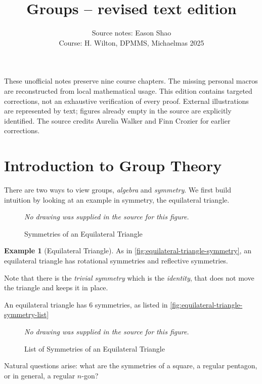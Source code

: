 \documentclass{article}
\title{Groups -- revised text edition}
\author{Source notes: Eason Shao\\Course: H. Wilton, DPMMS, Michaelmas 2025}
\date{}
\theoremstyle{definition}
\newtheorem*{example*}{Example}
\theoremstyle{remark}
\begin{document}
\maketitle
These unofficial notes preserve nine course chapters. The missing personal macros are reconstructed from local mathematical usage. This edition contains targeted corrections, not an exhaustive verification of every proof. External illustrations are represented by text; figures already empty in the source are explicitly identified. The source credits Aurelia Walker and Finn Crozier for earlier corrections.
\tableofcontents
\section{Introduction to Group Theory}
\label{sec:introduction-to-group-theory}

There are two ways to view groups, \emph{algebra} and \emph{symmetry}. We first build intuition by looking at an example in symmetry, the equilateral triangle.

\begin{figure}[ht!]
    \centering
    
    \emph{No drawing was supplied in the source for this figure.}\par
\caption{Symmetries of an Equilateral Triangle}
    \label{fig:equilateral-triangle-symmetry}
\end{figure}

\begin{example*}[Equilateral Triangle]
    As in \autoref{fig:equilateral-triangle-symmetry}, an equilateral triangle has rotational symmetries and reflective symmetries.
    
    Note that there is the \emph{trivial symmetry} which is the \emph{identity}, that does not move the triangle and keeps it in place.

    An equilateral triangle has 6 symmetries, as listed in \autoref{fig:equilateral-triangle-symmetry-list}
\end{example*}

\begin{figure}[ht!]
    \centering
    \emph{No drawing was supplied in the source for this figure.}\par
\caption{List of Symmetries of an Equilateral Triangle}
    \label{fig:equilateral-triangle-symmetry-list}
\end{figure}

Natural questions arise: what are the symmetries of a square, a regular pentagon, or in general, a regular \(n\)-gon?
\end{document}
